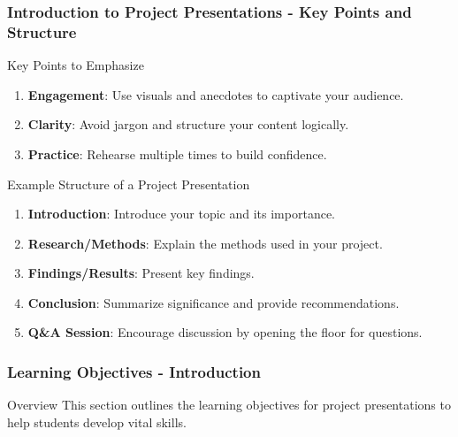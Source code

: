 \documentclass{beamer}
\begin{document}
\begin{frame}[fragile]
    \frametitle{Introduction to Project Presentations - Key Points and Structure}
    \begin{block}{Key Points to Emphasize}
        \begin{enumerate}
            \item \textbf{Engagement}: Use visuals and anecdotes to captivate your audience.
            \item \textbf{Clarity}: Avoid jargon and structure your content logically.
            \item \textbf{Practice}: Rehearse multiple times to build confidence.
        \end{enumerate}
    \end{block}
    
    \begin{block}{Example Structure of a Project Presentation}
        \begin{enumerate}
            \item \textbf{Introduction}: Introduce your topic and its importance.
            \item \textbf{Research/Methods}: Explain the methods used in your project.
            \item \textbf{Findings/Results}: Present key findings.
            \item \textbf{Conclusion}: Summarize significance and provide recommendations.
            \item \textbf{Q\&A Session}: Encourage discussion by opening the floor for questions.
        \end{enumerate}
    \end{block}
\end{frame}

\begin{frame}[fragile]
    \frametitle{Learning Objectives - Introduction}
    \begin{block}{Overview}
        This section outlines the learning objectives for project presentations to help students develop vital skills.
    \end{block}
\end{frame}
\end{document}
